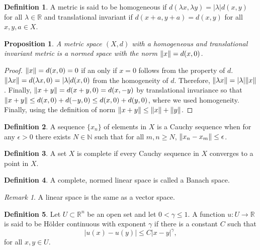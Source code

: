 \documentclass{article}
\DeclarePairedDelimiter\norm{\lVert}{\rVert}
\theoremstyle{plain}
\numberwithin{thm}{section}
\theoremstyle{plain}
\newtheorem{prop}{Proposition}
\numberwithin{prop}{section}
\theoremstyle{definition}
\newtheorem{defn}{Definition}
\numberwithin{defn}{section}
\theoremstyle{remark}
\newtheorem*{rem}{Remark}
\numberwithin{equation}{section}
\begin{document}
\begin{defn}\label{s22d4}
A metric is said to be homogeneous if $d(\lambda x, \lambda y) = |\lambda|d(x, y)$ for all $\lambda \in \mathbb{R}$
and translational invariant if $d(x + a, y + a) = d(x, y)$ for all $x, y, a \in X$.
\end{defn}

\begin{prop}\label{s22p2}
A metric space $(X, d)$ with a homogeneous and translational invariant metric is a normed space with the norm
$\norm{x} = d(x, 0)$.
\end{prop}
\begin{proof}
$\norm{x} = d(x, 0) = 0$ if an only if $x = 0$ follows from the property of $d$. $\norm{\lambda x} = d(\lambda x,
0) = |\lambda|d(x, 0)$ from the homogeneity of $d$. Therefore, $\norm{\lambda x} = |\lambda|\norm{x}$. Finally,
$\norm{x + y} = d(x + y, 0) = d(x, -y)$ by translational invariance so that $\norm{x + y} \le d(x, 0) + d(-y, 0)
\le d(x, 0) + d(y, 0)$, where we used homogeneity. Finally, using the definition of norm $\norm{x + y} \le \norm{x}
+ \norm{y}$.
\end{proof}

\begin{defn}\label{s22d5}
A sequence $\{x_n\}$ of elements in $X$ is a Cauchy sequence when for any $\epsilon > 0$ there exists $N \in 
\mathbb{N}$ such that for all $m, n \ge N$, $\norm{x_n - x_m} \le \epsilon$.
\end{defn}

\begin{defn}\label{s22d6}
A set $X$ is complete if every Cauchy sequence in $X$ converges to a point in $X$.
\end{defn}

\begin{defn}\label{s22d7}
A complete, normed linear space is called a Banach space.
\end{defn}

\begin{rem}
A linear space is the same as a vector space.
\end{rem}

\begin{defn}\label{s22d8}
Let $U \subset \mathbb{R}^n$ be an open set and let $0 < \gamma \le 1$. A function $u: U \rightarrow 
\mathbb{R}$ is said to be H\"{o}lder continuous with exponent $\gamma$ if there is a constant $C$ such that
\[
|u(x) - u(y)| \le C|x - y|^\gamma,
\]
for all $x, y \in U$.
\end{defn}
\end{document}
